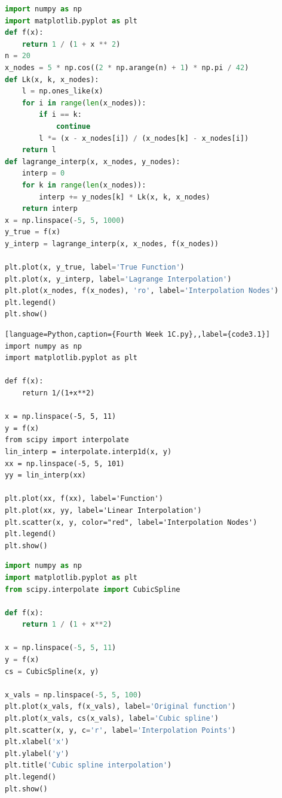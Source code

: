 \documentclass[a4paper,11pt,notitlepage]{article}
\begin{document}
\begin{lstlisting}[language=Python,caption={Fourth Week 1B.py},label={code2.1}]
import numpy as np
import matplotlib.pyplot as plt
def f(x):
    return 1 / (1 + x ** 2)
n = 20
x_nodes = 5 * np.cos((2 * np.arange(n) + 1) * np.pi / 42)
def Lk(x, k, x_nodes):
    l = np.ones_like(x)
    for i in range(len(x_nodes)):
        if i == k:
            continue
        l *= (x - x_nodes[i]) / (x_nodes[k] - x_nodes[i])
    return l
def lagrange_interp(x, x_nodes, y_nodes):
    interp = 0
    for k in range(len(x_nodes)):
        interp += y_nodes[k] * Lk(x, k, x_nodes)
    return interp
x = np.linspace(-5, 5, 1000)
y_true = f(x)
y_interp = lagrange_interp(x, x_nodes, f(x_nodes))

plt.plot(x, y_true, label='True Function')
plt.plot(x, y_interp, label='Lagrange Interpolation')
plt.plot(x_nodes, f(x_nodes), 'ro', label='Interpolation Nodes')
plt.legend()
plt.show()
\end{lstlisting}

\begin{lstlisting}[language=Python,caption={Fourth Week 1C.py},,label={code3.1}]
import numpy as np
import matplotlib.pyplot as plt

def f(x):
    return 1/(1+x**2)

x = np.linspace(-5, 5, 11)
y = f(x)
from scipy import interpolate
lin_interp = interpolate.interp1d(x, y)
xx = np.linspace(-5, 5, 101)
yy = lin_interp(xx)

plt.plot(xx, f(xx), label='Function')
plt.plot(xx, yy, label='Linear Interpolation')
plt.scatter(x, y, color="red", label='Interpolation Nodes')
plt.legend()
plt.show()
\end{lstlisting}

\begin{lstlisting}[language=Python,caption={Fourth Week 1D 1.py},label={code4.1}]
import numpy as np
import matplotlib.pyplot as plt
from scipy.interpolate import CubicSpline

def f(x):
    return 1 / (1 + x**2)

x = np.linspace(-5, 5, 11)
y = f(x)
cs = CubicSpline(x, y)

x_vals = np.linspace(-5, 5, 100)
plt.plot(x_vals, f(x_vals), label='Original function')
plt.plot(x_vals, cs(x_vals), label='Cubic spline') 
plt.scatter(x, y, c='r', label='Interpolation Points')
plt.xlabel('x')
plt.ylabel('y')
plt.title('Cubic spline interpolation')
plt.legend()
plt.show()
\end{lstlisting}
\end{document}
